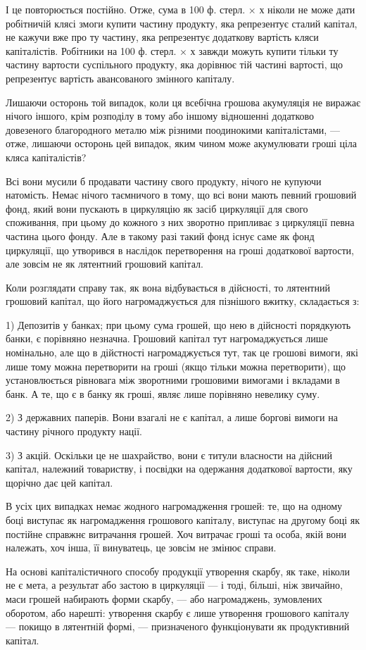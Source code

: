 \parcont{}  %
І це повторюється постійно. Отже, сума в 100 ф. стерл. × х ніколи не
може дати робітничій клясі змоги купити частину продукту, яка репрезентує
сталий капітал, не кажучи вже про ту частину, яка репрезентує додаткову
вартість кляси капіталістів. Робітники на 100 ф. стерл. × х завжди можуть
купити тільки ту частину вартости суспільного продукту, яка дорівнює
тій частині вартості, що репрезентує вартість авансованого змінного
капіталу.

Лишаючи осторонь той випадок, коли ця всебічна грошова акумуляція
не виражає нічого іншого, крім розподілу в тому або іншому відношенні
додатково довезеного благородного металю між різними поодинокими
капіталістами, — отже, лишаючи осторонь цей випадок, яким чином може
акумулювати гроші ціла кляса капіталістів?

Всі вони мусили б продавати частину свого продукту, нічого не купуючи
натомість. Немає нічого таємничого в тому, що всі вони мають
певний грошовий фонд, який вони пускають в циркуляцію як засіб циркуляції
для свого споживання, при цьому до кожного з них зворотно припливає
з циркуляції певна частина цього фонду. Але в такому разі такий фонд
існує саме як фонд циркуляції, що утворився в наслідок перетворення
на гроші додаткової вартости, але зовсім не як лятентний грошовий
капітал.

Коли розглядати справу так, як вона відбувається в дійсності, то лятентний
грошовий капітал, що його нагромаджується для пізнішого вжитку,
складається з:

1) Депозитів у банках; при цьому сума грошей, що нею в дійсності
порядкують банки, є порівняно незначна. Грошовий капітал тут нагромаджується
лише номінально, але що в дійстності нагромаджується тут,
так це грошові вимоги, які лише тому можна перетворити на гроші
(якщо тільки можна перетворити), що установлюється рівновага між
зворотними грошовими вимогами і вкладами в банк. А те, що є в банку
як гроші, являє лише порівняно невелику суму.

2) З державних паперів. Вони взагалі не є капітал, а лише боргові
вимоги на частину річного продукту нації.

3) З акцій. Оскільки це не шахрайство, вони є титули власности на
дійсний капітал, належний товариству, і посвідки на одержання додаткової
вартости, яку щорічно дає цей капітал.

В усіх цих випадках немає жодного нагромадження грошей: те, що
на одному боці виступає як нагромадження грошового капіталу, виступає
на другому боці як постійне справжнє витрачання грошей. Хоч витрачає
гроші та особа, якій вони належать, хоч інша, її винуватець, це зовсім
не змінює справи.

На основі капіталістичного способу продукції утворення скарбу, як
таке, ніколи не є мета, а результат або застою в циркуляції — і тоді,
більші, ніж звичайно, маси грошей набирають форми скарбу, — або нагромаджень,
зумовлених оборотом, або нарешті: утворення скарбу є лише
утворення грошового капіталу — покищо в лятентній формі, — призначеного
функціонувати як продуктивний капітал.
